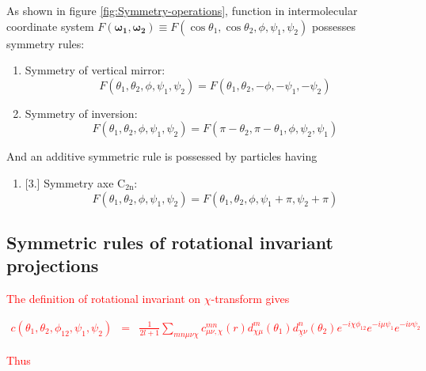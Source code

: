 As shown in figure \ref{fig:Symmetry-operations}, function in intermolecular
coordinate system $F(\boldsymbol{\omega_{1}},\boldsymbol{\omega_{2}})\equiv F(\cos\theta_{1},\cos\theta_{2},\phi,\psi_{1},\psi_{2})$
possesses symmetry rules:
\begin{enumerate}
\item Symmetry of vertical mirror: 
\begin{equation}
F(\theta_{1},\theta_{2},\phi,\psi_{1},\psi_{2})=F(\theta_{1},\theta_{2},-\phi,-\psi_{1},-\psi_{2})
\end{equation}
\item Symmetry of inversion: 
\begin{equation}
F(\theta_{1},\theta_{2},\phi,\psi_{1},\psi_{2})=F(\pi-\theta_{2},\pi-\theta_{1},\phi,\psi_{2},\psi_{1})
\end{equation}
\end{enumerate}
And an additive symmetric rule is possessed by particles having 
\begin{enumerate}
\item {}%
[3.]%
Symmetry axe $\mathrm{C_{2n}}$: 
\begin{equation}
F(\theta_{1},\theta_{2},\phi,\psi_{1},\psi_{2})=F(\theta_{1},\theta_{2},\phi,\psi_{1}+\pi,\psi_{2}+\pi)
\end{equation}
\end{enumerate}

\subsection{Symmetric rules of rotational invariant projections}

\textcolor{red}{The definition of rotational invariant on $\chi$-transform
gives}

\textcolor{red}{
\begin{eqnarray*}
c(\theta_{1},\theta_{2},\phi_{12},\psi_{1},\psi_{2}) & = & \frac{1}{2l+1}\sum_{mn\mu\nu\chi}c_{\mu\nu,\chi}^{mn}(r)d_{\chi\mu}^{m}(\theta_{1})d_{\underline{\chi}\nu}^{n}(\theta_{2})e^{-i\chi\phi_{12}}e^{-i\mu\psi_{1}}e^{-i\nu\psi_{2}}
\end{eqnarray*}
}

\textcolor{red}{Thus}

